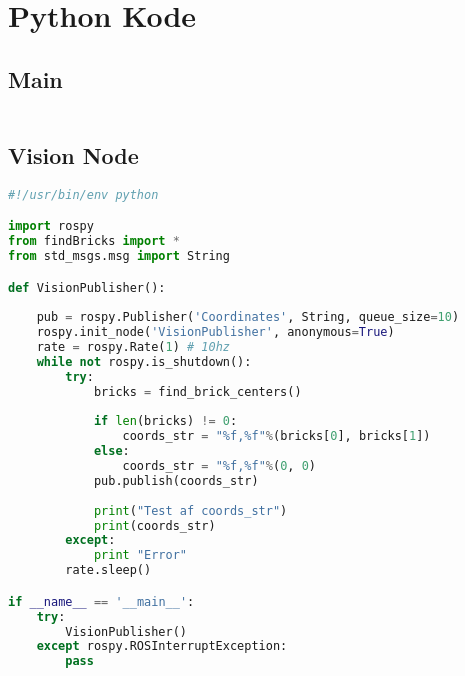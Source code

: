 \chapter{Python Kode}\label{app:PythonKode}
\section{Main}\label{sec:Main}
\begin{lstlisting}[language=Python]
\end{lstlisting}
\section{Vision Node}\label{sec:VisionNode}
\begin{lstlisting}[language=Python]
#!/usr/bin/env python

import rospy
from findBricks import *
from std_msgs.msg import String

def VisionPublisher():
    
    pub = rospy.Publisher('Coordinates', String, queue_size=10)
    rospy.init_node('VisionPublisher', anonymous=True)
    rate = rospy.Rate(1) # 10hz
    while not rospy.is_shutdown():
        try:
            bricks = find_brick_centers()
            
            if len(bricks) != 0:        
                coords_str = "%f,%f"%(bricks[0], bricks[1])
            else:
                coords_str = "%f,%f"%(0, 0)          
            pub.publish(coords_str)
            
            print("Test af coords_str")
            print(coords_str)
        except:
            print "Error"
        rate.sleep()

if __name__ == '__main__':
    try:
        VisionPublisher()
    except rospy.ROSInterruptException:
        pass
\end{lstlisting}
